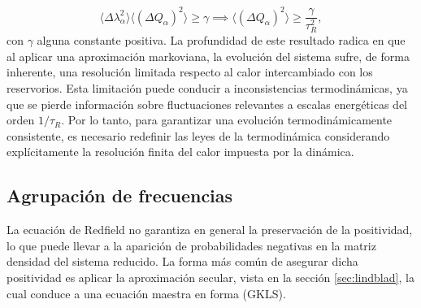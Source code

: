 \begin{equation*}
    \langle \Delta \lambda^{2}_{\alpha} \rangle \langle (\Delta Q_{\alpha})^{2}\rangle \geq \gamma \implies \langle (\Delta Q_{\alpha})^{2}\rangle  \geq \frac{\gamma}{\tau^{2}_{R}},
\end{equation*}
con $\gamma$ alguna constante positiva. La profundidad de este resultado radica en que al aplicar una aproximación markoviana, la evolución del sistema sufre, de forma inherente, una resolución limitada respecto al calor intercambiado con los reservorios. Esta limitación puede conducir a inconsistencias termodinámicas, ya que se pierde información sobre fluctuaciones relevantes a escalas energéticas del orden $1/\tau_{R}$. Por lo tanto, para garantizar una evolución termodinámicamente consistente, es necesario redefinir las leyes de la termodinámica considerando explícitamente la resolución finita del calor impuesta por la dinámica.

\label{sec2:finiteresol}

\subsection{Agrupación de frecuencias}
La ecuación de Redfield no garantiza en general la preservación de la positividad, lo que puede llevar a la aparición de probabilidades negativas en la matriz densidad del sistema reducido. La forma más común de asegurar dicha positividad es aplicar la aproximación secular, vista en la sección \ref{sec:lindblad}, la cual conduce a una ecuación maestra en forma (GKLS).

